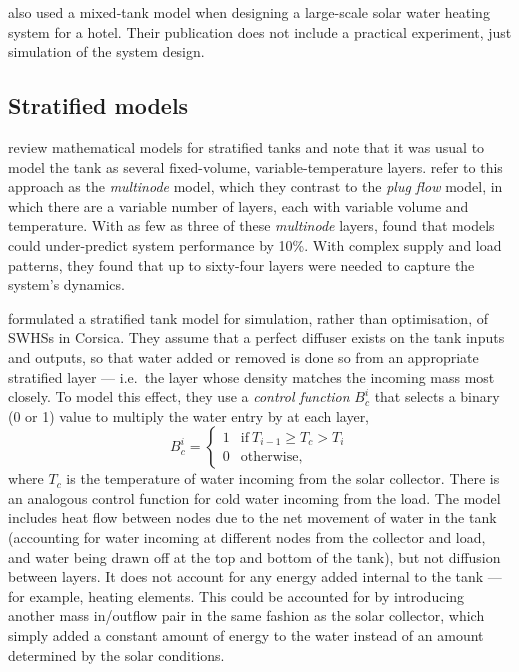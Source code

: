 \textcite{Cao14} also used a mixed-tank model when designing a large-scale solar water heating system for a hotel.
Their publication does not include a practical experiment, just simulation of the system design.

\subsection{Stratified models}
\label{sec:review:stratified-tank-models}

\textcite{Hollands89} review mathematical models for stratified tanks and note that it was usual to model the tank as several fixed-volume, variable-temperature layers.
\textcite{Kleinbach93} refer to this approach as the \emph{multinode} model, which they contrast to the \emph{plug flow} model, in which there are a variable number of layers, each with variable volume and temperature.
With as few as three of these \emph{multinode} layers,  found that models could under-predict system performance by 10\%.
With complex supply and load patterns, they found that up to sixty-four layers were needed to capture the system's dynamics.

\textcite{Cristofari02} formulated a stratified tank model for simulation, rather than optimisation, of SWHSs in Corsica.
They assume that a perfect diffuser exists on the tank inputs and outputs, so that water added or removed is done so from an appropriate stratified layer --- i.e.\ the layer whose density matches the incoming mass most closely.
To model this effect, they use a \emph{control function} $B_c^i$ that selects a binary (0 or 1) value to multiply the water entry by at each layer,
$$ B_c^i = \left\{ \begin{array}{ll}
   1 & \text{if}\ T_{i-1} \geq T_c > T_i \\
   0 & \text{otherwise},
\end{array} \right. $$
where $T_c$ is the temperature of water incoming from the solar collector.
There is an analogous control function for cold water incoming from the load.
The model includes heat flow between nodes due to the net movement of water in the tank (accounting for water incoming at different nodes from the collector and load, and water being drawn off at the top and bottom of the tank), but not diffusion between layers.
It does not account for any energy added internal to the tank --- for example, heating elements.
This could be accounted for by introducing another mass in/outflow pair in the same fashion as the solar collector, which simply added a constant amount of energy to the water instead of an amount determined by the solar conditions.

